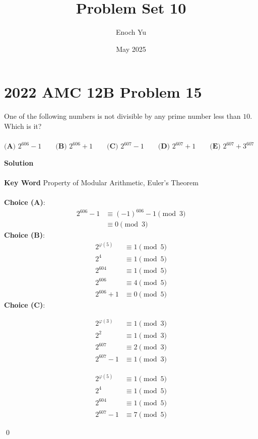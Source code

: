 \documentclass{article}
\title{Problem Set 10}
\author{Enoch Yu}
\date{May 2025}
\newenvironment{solution}{\begin{trivlist}\item[]{\bf Solution}}{\qed \end{trivlist}}
\begin{document}
\section*{2022 AMC 12B Problem 15}
One of the following numbers is not divisible by any prime number less than $10$. Which is it?
\\\\
$\textbf{(A) } 2^{606}-1 \qquad\textbf{(B) } 2^{606}+1 \qquad\textbf{(C) } 2^{607}-1 \qquad\textbf{(D) } 2^{607}+1\qquad\textbf{(E) } 2^{607}+3^{607}$
\begin{solution}
\\\\
\textbf{Key Word} Property of Modular Arithmetic, Euler's Theorem
\\\\
\textbf{Choice (A)}: \\
\begin{align*}
2^{606}-1&\equiv(-1)^{606}-1 \pmod{3} \\
&\equiv0\pmod3
\end{align*}
\textbf{Choice (B)}:
\begin{align*}
    2^{\varphi(5)}&\equiv1 \pmod{5} \\
    2^{4}&\equiv1 \pmod{5} \\
    2^{604}&\equiv1 \pmod{5} \\
    2^{606}&\equiv4 \pmod{5} \\
    2^{606}+1&\equiv0 \pmod{5}
\end{align*}
\textbf{Choice (C)}: \\
\begin{minipage}{0.33333333\textwidth}
\begin{align*}
    2^{\varphi(3)}&\equiv1 \pmod{3} \\
    2^{2}&\equiv1 \pmod{3} \\
    2^{607}&\equiv2 \pmod{3} \\
    2^{607}-1&\equiv1 \pmod{3}
\end{align*}
\end{minipage}
\begin{minipage}{0.33333333\textwidth}
\begin{align*}
    2^{\varphi(5)}&\equiv1 \pmod{5} \\
    2^{4}&\equiv1 \pmod{5} \\
    2^{604}&\equiv1 \pmod{5} \\
    2^{607}-1&\equiv7 \pmod{5}
\end{align*}
\end{minipage}
\begin{minipage}{0.33333333\textwidth}

\end{minipage}
\end{solution}
\end{document}
